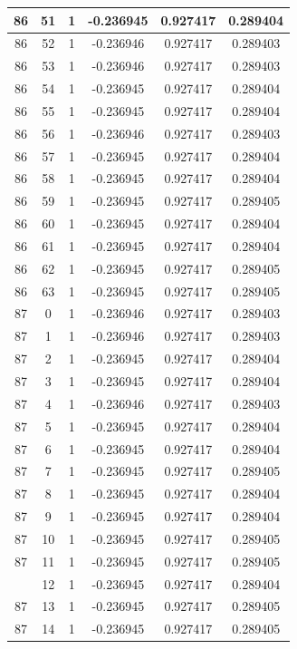 \documentclass[12pt,a4paper]{article}
\numberwithin{equation}{section}
\numberwithin{figure}{section}
\numberwithin{table}{section}
\begin{document}
\begin{longtable}{|c|c|c|c|c|c|}
86 & 51 & 1 & -0.236945 & 0.927417 & 0.289404 \\ \hline
86 & 52 & 1 & -0.236946 & 0.927417 & 0.289403 \\ \hline
86 & 53 & 1 & -0.236946 & 0.927417 & 0.289403 \\ \hline
86 & 54 & 1 & -0.236945 & 0.927417 & 0.289404 \\ \hline
86 & 55 & 1 & -0.236945 & 0.927417 & 0.289404 \\ \hline
86 & 56 & 1 & -0.236946 & 0.927417 & 0.289403 \\ \hline
86 & 57 & 1 & -0.236945 & 0.927417 & 0.289404 \\ \hline
86 & 58 & 1 & -0.236945 & 0.927417 & 0.289404 \\ \hline
86 & 59 & 1 & -0.236945 & 0.927417 & 0.289405 \\ \hline
86 & 60 & 1 & -0.236945 & 0.927417 & 0.289404 \\ \hline
86 & 61 & 1 & -0.236945 & 0.927417 & 0.289404 \\ \hline
86 & 62 & 1 & -0.236945 & 0.927417 & 0.289405 \\ \hline
86 & 63 & 1 & -0.236945 & 0.927417 & 0.289405 \\ \hline
87 & 0 & 1 & -0.236946 & 0.927417 & 0.289403 \\ \hline
87 & 1 & 1 & -0.236946 & 0.927417 & 0.289403 \\ \hline
87 & 2 & 1 & -0.236945 & 0.927417 & 0.289404 \\ \hline
87 & 3 & 1 & -0.236945 & 0.927417 & 0.289404 \\ \hline
87 & 4 & 1 & -0.236946 & 0.927417 & 0.289403 \\ \hline
87 & 5 & 1 & -0.236945 & 0.927417 & 0.289404 \\ \hline
87 & 6 & 1 & -0.236945 & 0.927417 & 0.289404 \\ \hline
87 & 7 & 1 & -0.236945 & 0.927417 & 0.289405 \\ \hline
87 & 8 & 1 & -0.236945 & 0.927417 & 0.289404 \\ \hline
87 & 9 & 1 & -0.236945 & 0.927417 & 0.289404 \\ \hline
87 & 10 & 1 & -0.236945 & 0.927417 & 0.289405 \\ \hline
87 & 11 & 1 & -0.236945 & 0.927417 & 0.289405 \\ \hline
\pagebreak
87 & 12 & 1 & -0.236945 & 0.927417 & 0.289404 \\ \hline
87 & 13 & 1 & -0.236945 & 0.927417 & 0.289405 \\ \hline
87 & 14 & 1 & -0.236945 & 0.927417 & 0.289405 \\ \hline

\end{longtable}
\end{document}
